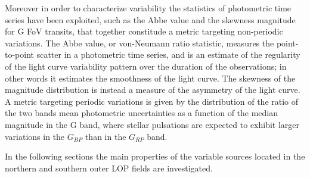 Moreover in order to characterize variability the statistics of photometric time series have been exploited, such as the Abbe value and the skewness magnitude for G FoV transits, that together constitude a metric targeting non-periodic variations.
The Abbe value, or von-Neumann ratio statistic, measures the point-to-point scatter in a photometric time series, and is an estimate of the regularity of the light curve variability pattern over the duration of the observations; in other words it estimates the smoothness of the light curve. The skewness of the magnitude distribution is instead a measure of the asymmetry of the light curve.
A metric targeting periodic variations is given by the distribution of the ratio of the two bands mean photometric uncertainties as a function of the median magnitude in the G band,
where stellar pulsations are expected to exhibit larger variations in the $G_{BP}$ than in the $G_{RP}$ band.


In the following sections the main properties of the variable sources located in the northern and southern outer LOP fields are investigated.








